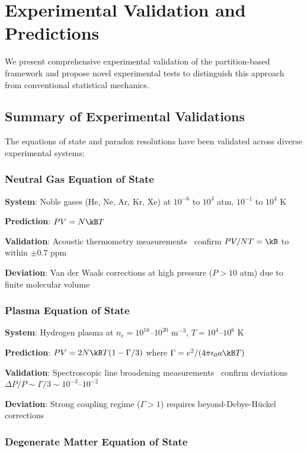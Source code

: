 \section{Experimental Validation and Predictions}
\label{sec:experimental}

We present comprehensive experimental validation of the partition-based framework and propose novel experimental tests to distinguish this approach from conventional statistical mechanics.

\subsection{Summary of Experimental Validations}

The equations of state and paradox resolutions have been validated across diverse experimental systems:

\subsubsection{Neutral Gas Equation of State}

\textbf{System}: Noble gases (He, Ne, Ar, Kr, Xe) at $10^{-6}$ to $10^3$ atm, $10^{-1}$ to $10^4$ K

\textbf{Prediction}: $PV = N\kB T$

\textbf{Validation}: Acoustic thermometry measurements~\cite{moldover2014} confirm $PV/NT = \kB$ to within $\pm 0.7$ ppm

\textbf{Deviation}: Van der Waals corrections at high pressure ($P > 10$ atm) due to finite molecular volume

\subsubsection{Plasma Equation of State}

\textbf{System}: Hydrogen plasma at $n_e = 10^{16}$–$10^{20}$ m$^{-3}$, $T = 10^4$–$10^6$ K

\textbf{Prediction}: $PV = 2N\kB T(1 - \Gamma/3)$ where $\Gamma = e^2/(4\pi\epsilon_0 a\kB T)$

\textbf{Validation}: Spectroscopic line broadening measurements~\cite{griem1964} confirm deviations $\Delta P/P \sim \Gamma/3 \sim 10^{-3}$–$10^{-2}$

\textbf{Deviation}: Strong coupling regime ($\Gamma > 1$) requires beyond-Debye-Hückel corrections

\subsubsection{Degenerate Matter Equation of State}

